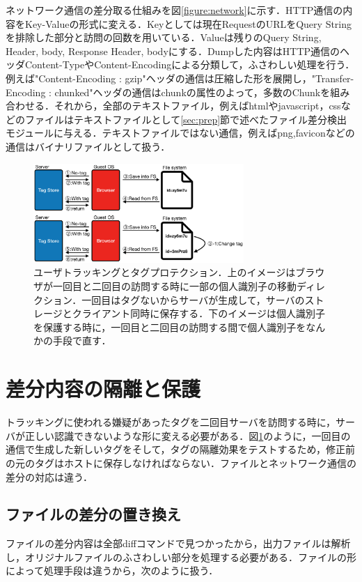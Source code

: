 \documentclass[submit]{ipsj}
\begin{document}
ネットワーク通信の差分取る仕組みを図\ref{figure:network}に示す．HTTP通信の内容をKey-Valueの形式に変える．Keyとしては現在RequestのURLをQuery Stringを排除した部分と訪問の回数を用いている．Valueは残りのQuery String, Header, body, Response Header, bodyにする．Dumpした内容はHTTP通信のヘッダContent-TypeやContent-Encodingによる分類して，ふさわしい処理を行う．例えば"Content-Encoding : gzip"ヘッダの通信は圧縮した形を展開し，"Transfer-Encoding : chunked"ヘッダの通信はchunkの属性のよって，多数のChunkを組み合わせる．それから，全部のテキストファイル，例えばhtmlやjavascript，cssなどのファイルはテキストファイルとして\ref{sec:prep}節で述べたファイル差分検出モジュールに与える．テキストファイルではない通信，例えばpng,faviconなどの通信はバイナリファイルとして扱う．




\begin{figure}[ht]
\begin{center}
\includegraphics[width=8cm]{img/tag.eps}
\caption{ユーザトラッキングとタグプロテクション．上のイメージはブラウザが一回目と二回目の訪問する時に一部の個人識別子の移動ディレクション．一回目はタグないからサーバが生成して，サーバのストレージとクライアント同時に保存する．下のイメージは個人識別子を保護する時に，一回目と二回目の訪問する間で個人識別子をなんかの手段で直す．}
\label{figure:tag}
\end{center}
\end{figure}


\section{差分内容の隔離と保護}
\label{cha:protect}
トラッキングに使われる嫌疑があったタグを二回目サーバを訪問する時に，サーバが正しい認識できないような形に変える必要がある．図\ref{figure:tag}のように，一回目の通信で生成した新しいタグをそして，タグの隔離効果をテストするため，修正前の元のタグはホストに保存しなければならない．ファイルとネットワーク通信の差分の対応は違う．

\subsection{ファイルの差分の置き換え}
ファイルの差分内容は全部diffコマンドで見つかったから，出力ファイルは解析し，オリジナルファイルのふさわしい部分を処理する必要がある．ファイルの形によって処理手段は違うから，次のように扱う．
\end{document}
